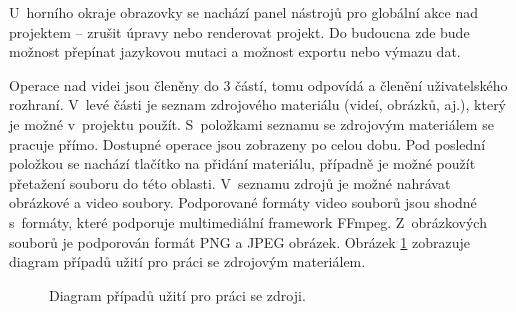 U~horního okraje obrazovky se nachází panel nástrojů pro globální akce nad projektem -- zrušit úpravy nebo renderovat projekt. Do budoucna zde bude možnost přepínat jazykovou mutaci a možnost exportu nebo výmazu dat.

Operace nad videi jsou členěny do 3 částí, tomu odpovídá a členění uživatelského rozhraní. V~levé části je seznam zdrojového materiálu (videí, obrázků, aj.), který je možné v~projektu použít. S~položkami seznamu se zdrojovým materiálem se pracuje přímo. Dostupné operace jsou zobrazeny po celou dobu. Pod poslední položkou se nachází tlačítko na přidání materiálu, případně je možné použít přetažení souboru do této oblasti. V~seznamu zdrojů je možné nahrávat obrázkové a video soubory. Podporované formáty video souborů jsou shodné s~formáty, které podporuje multimediální framework FFmpeg. Z~obrázkových souborů je podporován formát PNG a JPEG obrázek. Obrázek \ref{img:ucd-zdroj} zobrazuje diagram případů užití pro práci se zdrojovým materiálem.
\begin{figure}[h]
	\centering
	\caption{Diagram případů užití pro práci se zdroji.}\label{img:ucd-zdroj}
\end{figure}

